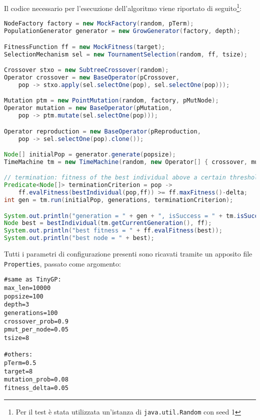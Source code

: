 \documentclass{../llncs}
\begin{document}
\noindent Il codice necessario per l'esecuzione dell'algoritmo viene riportato di seguito\footnote{Per il test è stata utilizzata un'istanza di \texttt{java.util.Random} con seed 1}:
\begin{lstlisting}[language=Java,caption={Estratto di \texttt{TestLauncher}}]
NodeFactory factory = new MockFactory(random, pTerm);
PopulationGenerator generator = new GrowGenerator(factory, depth);

FitnessFunction ff = new MockFitness(target);
SelectionMechanism sel = new TournamentSelection(random, ff, tsize);

Crossover stxo = new SubtreeCrossover(random);
Operator crossover = new BaseOperator(pCrossover,
	pop -> stxo.apply(sel.selectOne(pop), sel.selectOne(pop)));

Mutation ptm = new PointMutation(random, factory, pMutNode);
Operator mutation = new BaseOperator(pMutation,
	pop -> ptm.mutate(sel.selectOne(pop)));

Operator reproduction = new BaseOperator(pReproduction,
	pop -> sel.selectOne(pop).clone());

Node[] initialPop = generator.generate(popsize);
TimeMachine tm = new TimeMachine(random, new Operator[] { crossover, mutation, reproduction });

// termination: fitness of the best individual above a certain threshold
Predicate<Node[]> terminationCriterion = pop -> 
	ff.evalFitness(bestIndividual(pop,ff)) >= ff.maxFitness()-delta;
int gen = tm.run(initialPop, generations, terminationCriterion);

System.out.println("generation = " + gen + ", isSuccess = " + tm.isSuccess(terminationCriterion));
Node best = bestIndividual(tm.getCurrentGeneration(), ff);
System.out.println("best fitness = " + ff.evalFitness(best));
System.out.println("best node = " + best);
\end{lstlisting}

Tutti i parametri di configurazione presenti sono ricavati tramite un apposito file \texttt{Properties}, passato come argomento:
\begin{lstlisting}[caption={File mockimpl.properties}]
#same as TinyGP:
max_len=10000
popsize=100
depth=3
generations=100
crossover_prob=0.9
pmut_per_node=0.05
tsize=8

#others:
pTerm=0.5
target=8
mutation_prob=0.08
fitness_delta=0.05
\end{lstlisting}
\end{document}
